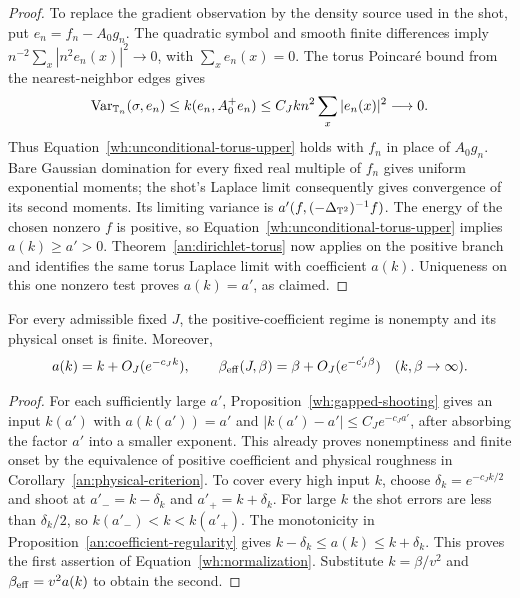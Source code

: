 \begin{proof}
To replace the gradient observation by the density source used
in the shot, put $e_n=f_n-A_0g_n$.  The quadratic symbol and
smooth finite differences imply
$n^{-2}\sum_x|n^2e_n(x)|^2\to0$, with $\sum_xe_n(x)=0$.
The torus Poincar\'e bound from the nearest-neighbor edges gives
\[
 \operatorname{Var}_{\mathbb T_n}(\sigma,e_n)
 \le k(e_n,A_0^+e_n)
 \le C_Jk n^2\sum_x|e_n(x)|^2\longrightarrow0.
\]
Thus Equation~\eqref{wh:unconditional-torus-upper} holds with
$f_n$ in place of $A_0g_n$.  Bare Gaussian domination for every
fixed real multiple of $f_n$ gives uniform exponential moments;
the shot's Laplace limit consequently gives convergence of its
second moments.  Its limiting variance is
$a'(f,(-\Delta_{\mathbb T^2})^{-1}f)$.  The energy of the chosen nonzero
$f$ is positive, so Equation~\eqref{wh:unconditional-torus-upper}
implies $a(k)\ge a'>0$.  Theorem~\ref{an:dirichlet-torus} now
applies on the positive branch and identifies the same torus
Laplace limit with coefficient $a(k)$.  Uniqueness on this one
nonzero test proves $a(k)=a'$, as claimed.
\end{proof}

\begin{corollary}\label{wh:high-temperature}
For every admissible fixed $J$, the positive-coefficient regime is
nonempty and its physical onset is finite.  Moreover,
\begin{equation}\label{wh:normalization}
 a(k)=k+O_J(e^{-c_Jk}),\qquad
 \beta_{\mathrm{eff}}(J,\beta)=\beta+O_J(e^{-c_J'\beta})
       \quad(k,\beta\to\infty).
\end{equation}
\end{corollary}

\begin{proof}
For each sufficiently large $a'$, Proposition~\ref{wh:gapped-shooting}
gives an input $k(a')$ with $a(k(a'))=a'$ and
$|k(a')-a'|\le C_Je^{-c_Ja'}$, after absorbing the factor $a'$
into a smaller exponent.  This already proves nonemptiness and
finite onset by the equivalence of positive coefficient and physical
roughness in Corollary~\ref{an:physical-criterion}.  To cover every high input $k$, choose
$\delta_k=e^{-c_Jk/2}$ and shoot at $a'_- =k-\delta_k$ and
$a'_+=k+\delta_k$.  For large $k$ the shot errors are less than
$\delta_k/2$, so $k(a'_- )<k<k(a'_+)$.  The monotonicity in
Proposition~\ref{an:coefficient-regularity}
gives $k-\delta_k\le a(k)\le k+\delta_k$.
This proves the first assertion of Equation~\eqref{wh:normalization}.
Substitute $k=\beta/v^2$ and $\beta_{\mathrm{eff}}=v^2a(k)$ to obtain the second.
\end{proof}

